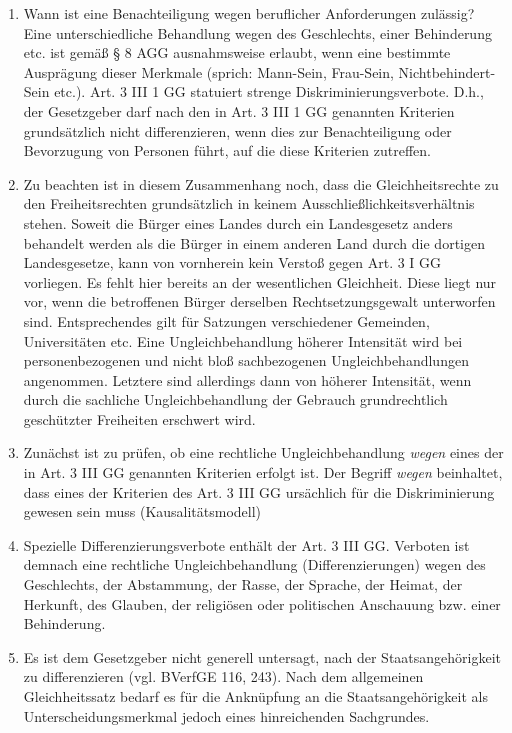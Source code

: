\documentclass{article}
\begin{document}
	\begin{enumerate}[label=(\alph*)]
		\item Wann ist eine Benachteiligung wegen beruflicher Anforderungen zulässig? Eine unterschiedliche Behandlung wegen des Geschlechts, einer Behinderung etc. ist gemäß § 8 AGG ausnahmsweise erlaubt, wenn eine bestimmte Ausprägung dieser Merkmale (sprich: Mann-Sein, Frau-Sein, Nichtbehindert-Sein etc.). Art. 3 III 1 GG statuiert strenge Diskriminierungsverbote. D.h., der Gesetzgeber darf nach den in Art. 3 III 1 GG genannten Kriterien grundsätzlich nicht differenzieren, wenn dies zur Benachteiligung oder Bevorzugung von Personen führt, auf die diese Kriterien zutreffen.
		\item Zu beachten ist in diesem Zusammenhang noch, dass die Gleichheitsrechte zu den Freiheitsrechten grundsätzlich in keinem Ausschließlichkeitsverhältnis stehen. Soweit die Bürger eines Landes durch ein Landesgesetz anders behandelt werden als die Bürger in einem anderen Land durch die dortigen Landesgesetze, kann von vornherein kein Verstoß gegen Art. 3 I GG vorliegen. Es fehlt hier bereits an der wesentlichen Gleichheit. Diese liegt nur vor, wenn die betroffenen Bürger derselben Rechtsetzungsgewalt unterworfen sind. Entsprechendes gilt für Satzungen verschiedener Gemeinden, Universitäten etc. Eine Ungleichbehandlung höherer Intensität wird bei personenbezogenen und nicht bloß sachbezogenen Ungleichbehandlungen angenommen. Letztere sind allerdings dann von höherer Intensität, wenn durch die sachliche Ungleichbehandlung der Gebrauch grundrechtlich geschützter Freiheiten erschwert wird.
		\item Zunächst ist zu prüfen, ob eine rechtliche Ungleichbehandlung \textit{wegen} eines der in Art. 3 III GG genannten Kriterien erfolgt ist. Der Begriff \textit{wegen} beinhaltet, dass eines der Kriterien des Art. 3 III GG ursächlich für die Diskriminierung gewesen sein muss (Kausalitätsmodell)
		\item Spezielle Differenzierungsverbote enthält der Art. 3 III GG. Verboten ist demnach eine rechtliche Ungleichbehandlung (Differenzierungen) wegen des Geschlechts, der Abstammung, der Rasse, der Sprache, der Heimat, der Herkunft, des Glauben, der religiösen oder politischen Anschauung bzw. einer Behinderung. 
		\item Es ist dem Gesetzgeber nicht generell untersagt, nach der Staatsangehörigkeit zu differenzieren (vgl. BVerfGE 116, 243). Nach dem allgemeinen Gleichheitssatz bedarf es für die Anknüpfung an die Staatsangehörigkeit als Unterscheidungsmerkmal jedoch eines hinreichenden Sachgrundes.
	\end{enumerate}
	
\end{document}
